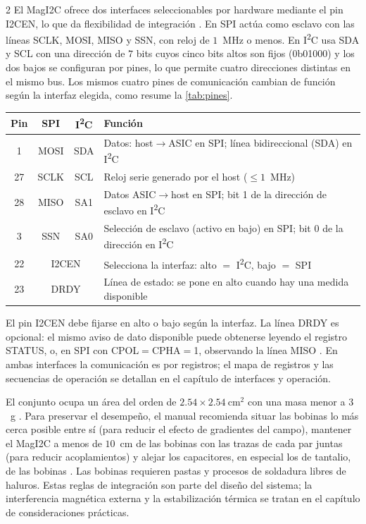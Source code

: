 \documentclass[11pt,letterpaper]{article}
\begin{document}
\begin{multicols*}{2}
El MagI2C ofrece dos interfaces seleccionables por hardware mediante el pin I2CEN, lo que da flexibilidad de integración \citep{pni_manual}. En SPI actúa como esclavo con las líneas SCLK, MOSI, MISO y SSN, con reloj de $1$~MHz o menos. En I\textsuperscript{2}C usa SDA y SCL con una dirección de $7$ bits cuyos cinco bits altos son fijos (0b01000) y los dos bajos se configuran por pines, lo que permite cuatro direcciones distintas en el mismo bus. Los mismos cuatro pines de comunicación cambian de función según la interfaz elegida, como resume la \cref{tab:pines}.
 
\begin{center}
    \label{tab:pines}
    \footnotesize
    \begin{tabular}{@{}c c c p{3.9cm}@{}}
        \hline
        Pin & SPI & I\textsuperscript{2}C & Función \\
        \hline
        1  & MOSI & SDA & Datos: host$\rightarrow$ASIC en SPI; línea bidireccional (SDA) en I\textsuperscript{2}C \\
        27 & SCLK & SCL & Reloj serie generado por el host ($\leq 1$~MHz) \\
        28 & MISO & SA1 & Datos ASIC$\rightarrow$host en SPI; bit 1 de la dirección de esclavo en I\textsuperscript{2}C \\
        3  & SSN  & SA0 & Selección de esclavo (activo en bajo) en SPI; bit 0 de la dirección en I\textsuperscript{2}C \\
        22 & \multicolumn{2}{c}{I2CEN} & Selecciona la interfaz: alto $=$ I\textsuperscript{2}C, bajo $=$ SPI \\
        23 & \multicolumn{2}{c}{DRDY} & Línea de estado: se pone en alto cuando hay una medida disponible \\
        \hline
    \end{tabular}
\end{center}
 
El pin I2CEN debe fijarse en alto o bajo según la interfaz. La línea DRDY es opcional: el mismo aviso de dato disponible puede obtenerse leyendo el registro STATUS, o, en SPI con CPOL$=$CPHA$=$1, observando la línea MISO \citep{pni_manual}. En ambas interfaces la comunicación es por registros; el mapa de registros y las secuencias de operación se detallan en el capítulo de interfaces y operación.

El conjunto ocupa un área del orden de $2.54\times2.54\ \mathrm{cm}^2$ con una masa menor a $3$~g \citep{regoli2018}. Para preservar el desempeño, el manual recomienda situar las bobinas lo más cerca posible entre sí (para reducir el efecto de gradientes del campo), mantener el MagI2C a menos de $10$~cm de las bobinas con las trazas de cada par juntas (para reducir acoplamientos) y alejar los capacitores, en especial los de tantalio, de las bobinas \citep{pni_manual}. Las bobinas requieren pastas y procesos de soldadura libres de haluros. Estas reglas de integración son parte del diseño del sistema; la interferencia magnética externa y la estabilización térmica se tratan en el capítulo de consideraciones prácticas.



\end{multicols*}
\end{document}
